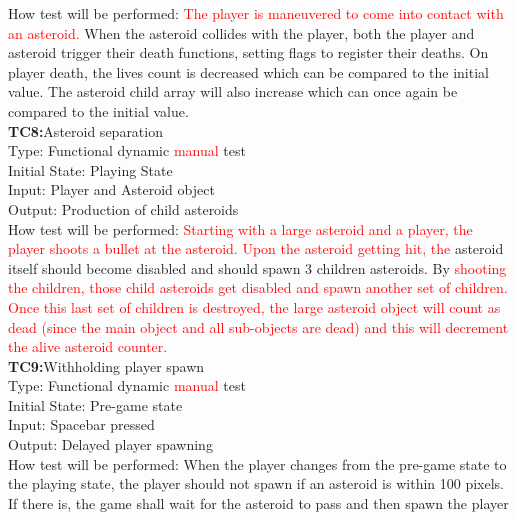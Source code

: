 \documentclass[12pt, titlepage]{article}
\begin{document}
How test will be performed: \textcolor{red}{The player is maneuvered to come into contact with an asteroid.} When the asteroid collides with the player, both the player and asteroid trigger their death functions, setting flags to register their deaths. On player death, the lives count is decreased which can be compared to the initial value. The asteroid child array will also increase which can once again be compared to the initial value.\\

\textbf{TC8:}Asteroid separation\\

Type: Functional dynamic \textcolor{red}{manual} test\\

Initial State: Playing State\\

Input: Player and Asteroid object\\

Output: Production of child asteroids\\

How test will be performed: \textcolor{red}{Starting with a large asteroid and a player, the player shoots a bullet at the asteroid. Upon the asteroid getting hit, the} asteroid itself should become disabled and should spawn 3 children asteroids. By \textcolor{red}{shooting the children, those child asteroids get disabled and spawn another set of children. Once this last set of children is destroyed, the large asteroid object will count as dead (since the main object and all sub-objects are dead) and this will decrement the alive asteroid counter.}\\

\textbf{TC9:}Withholding player spawn\\

Type: Functional dynamic \textcolor{red}{manual} test\\

Initial State: Pre-game state\\

Input: Spacebar pressed\\

Output: Delayed player spawning\\

How test will be performed: When the player changes from the pre-game state to the playing state, the player should not spawn if an asteroid is within 100 pixels. If there is, the game shall wait for the asteroid to pass and then spawn the player\\
\end{document}
